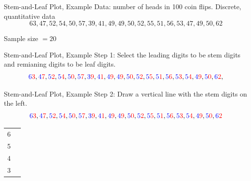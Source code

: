 \documentclass{beamer}
\newcommand{\blue}[1]{{\color{blue} #1}}
\newcommand{\red}[1]{{\color{red} #1}}
\newcommand{\bluRed}[2]{{\color{blue} #1}{\color{red} #2}}
\begin{document}
\begin{frame}{Stem-and-Leaf Plot, Example}
    Data: number of heads in 100 coin flips. Discrete, quantitative data
    \[63,47,52,54,50,
        57,39,41,49,49,
        50, 52, 55, 51, 56,
        53, 47, 49, 50, 62 \]
    \begin{center}
        Sample size $= 20$
    \end{center}
\end{frame}

\begin{frame}{Stem-and-Leaf Plot, Example}
    Step 1: Select the \blue{leading} digits to be \blue{stem} digits and \red{remianing} digits to be \red{leaf} digits.
    \[\bluRed{6}{3},
        \bluRed{4}{7},
        \bluRed{5}{2},
        \bluRed{5}{4},
        \bluRed{5}{0},
        \bluRed{5}{7},
        \bluRed{3}{9},
        \bluRed{4}{1},
        \bluRed{4}{9},
        \bluRed{4}{9},
        \bluRed{5}{0},
        \bluRed{5}{2},
        \bluRed{5}{5},
        \bluRed{5}{1},
        \bluRed{5}{6},
        \bluRed{5}{3},
        \bluRed{5}{4},
        \bluRed{4}{9},
        \bluRed{5}{0},
        \bluRed{6}{2}, \]
\end{frame}

\begin{frame}{Stem-and-Leaf Plot, Example}
    Step 2: Draw a vertical line with the \blue{stem} digits on the left.
    \[\bluRed{6}{3},
        \bluRed{4}{7},
        \bluRed{5}{2},
        \bluRed{5}{4},
        \bluRed{5}{0},
        \bluRed{5}{7},
        \bluRed{3}{9},
        \bluRed{4}{1},
        \bluRed{4}{9},
        \bluRed{4}{9},
        \bluRed{5}{0},
        \bluRed{5}{2},
        \bluRed{5}{5},
        \bluRed{5}{1},
        \bluRed{5}{6},
        \bluRed{5}{3},
        \bluRed{5}{4},
        \bluRed{4}{9},
        \bluRed{5}{0},
        \bluRed{6}{2}\]
    \begin{table}
        \begin{tabular}{r | l}
            \blue{6} & \\
            \blue{5} & \\
            \blue{4} & \\
            \blue{3} & \\
        \end{tabular}
    \end{table}
\end{frame}
\end{document}

